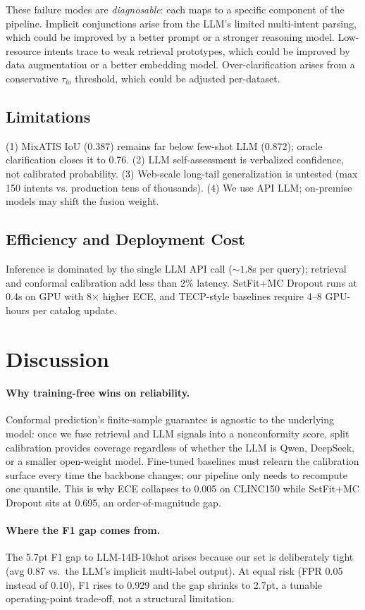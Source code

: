 \documentclass[sigconf, anonymous, review]{acmart}
\begin{document}
These failure modes are \emph{diagnosable}: each maps to a specific component of the pipeline. Implicit conjunctions arise from the LLM's limited multi-intent parsing, which could be improved by a better prompt or a stronger reasoning model. Low-resource intents trace to weak retrieval prototypes, which could be improved by data augmentation or a better embedding model. Over-clarification arises from a conservative $\tau_{lo}$ threshold, which could be adjusted per-dataset.

\subsection{Limitations}
(1) MixATIS IoU (0.387) remains far below few-shot LLM (0.872); oracle clarification closes it to 0.76. (2) LLM self-assessment is verbalized confidence, not calibrated probability. (3) Web-scale long-tail generalization is untested (max 150 intents vs. production tens of thousands). (4) We use API LLM; on-premise models may shift the fusion weight.

\subsection{Efficiency and Deployment Cost}
Inference is dominated by the single LLM API call (${\sim}1.8$s per query); retrieval and conformal calibration add less than 2\% latency. SetFit+MC Dropout runs at 0.4s on GPU with 8$\times$ higher ECE, and TECP-style baselines require 4--8 GPU-hours per catalog update.

\section{Discussion}
\label{sec:discussion}
\paragraph{Why training-free wins on reliability.}
Conformal prediction's finite-sample guarantee is agnostic to the underlying model: once we fuse retrieval and LLM signals into a nonconformity score, split calibration provides coverage regardless of whether the LLM is Qwen, DeepSeek, or a smaller open-weight model. Fine-tuned baselines must relearn the calibration surface every time the backbone changes; our pipeline only needs to recompute one quantile. This is why ECE collapses to 0.005 on CLINC150 while SetFit+MC Dropout sits at 0.695, an order-of-magnitude gap.

\paragraph{Where the F1 gap comes from.}
The 5.7pt F1 gap to LLM-14B-10shot arises because our set is deliberately tight (avg 0.87 vs.\ the LLM's implicit multi-label output). At equal risk (FPR 0.05 instead of 0.10), F1 rises to 0.929 and the gap shrinks to 2.7pt, a tunable operating-point trade-off, not a structural limitation.
\end{document}
